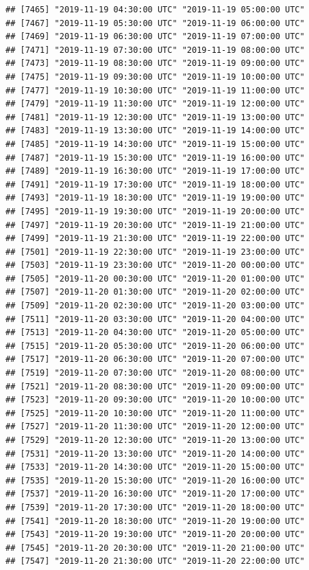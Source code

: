 \documentclass{article}\usepackage[]{graphicx}\usepackage[]{color}
\makeatletter
\newenvironment{kframe}{%
 \def\at@end@of@kframe{}%
 \ifinner\ifhmode%
  \def\at@end@of@kframe{\end{minipage}}%
  \begin{minipage}{\columnwidth}%
 \fi\fi%
 \def\FrameCommand##1{\hskip\@totalleftmargin \hskip-\fboxsep
 \colorbox{shadecolor}{##1}\hskip-\fboxsep
     \hskip-\linewidth \hskip-\@totalleftmargin \hskip\columnwidth}%
 \MakeFramed {\advance\hsize-\width
   \@totalleftmargin\z@ \linewidth\hsize
   \@setminipage}}%
 {\par\unskip\endMakeFramed%
 \at@end@of@kframe}
\newenvironment{knitrout}{}{} %
\makeatother
\begin{document}
\begin{knitrout}
\begin{kframe}
\begin{verbatim}
## [7465] "2019-11-19 04:30:00 UTC" "2019-11-19 05:00:00 UTC"
## [7467] "2019-11-19 05:30:00 UTC" "2019-11-19 06:00:00 UTC"
## [7469] "2019-11-19 06:30:00 UTC" "2019-11-19 07:00:00 UTC"
## [7471] "2019-11-19 07:30:00 UTC" "2019-11-19 08:00:00 UTC"
## [7473] "2019-11-19 08:30:00 UTC" "2019-11-19 09:00:00 UTC"
## [7475] "2019-11-19 09:30:00 UTC" "2019-11-19 10:00:00 UTC"
## [7477] "2019-11-19 10:30:00 UTC" "2019-11-19 11:00:00 UTC"
## [7479] "2019-11-19 11:30:00 UTC" "2019-11-19 12:00:00 UTC"
## [7481] "2019-11-19 12:30:00 UTC" "2019-11-19 13:00:00 UTC"
## [7483] "2019-11-19 13:30:00 UTC" "2019-11-19 14:00:00 UTC"
## [7485] "2019-11-19 14:30:00 UTC" "2019-11-19 15:00:00 UTC"
## [7487] "2019-11-19 15:30:00 UTC" "2019-11-19 16:00:00 UTC"
## [7489] "2019-11-19 16:30:00 UTC" "2019-11-19 17:00:00 UTC"
## [7491] "2019-11-19 17:30:00 UTC" "2019-11-19 18:00:00 UTC"
## [7493] "2019-11-19 18:30:00 UTC" "2019-11-19 19:00:00 UTC"
## [7495] "2019-11-19 19:30:00 UTC" "2019-11-19 20:00:00 UTC"
## [7497] "2019-11-19 20:30:00 UTC" "2019-11-19 21:00:00 UTC"
## [7499] "2019-11-19 21:30:00 UTC" "2019-11-19 22:00:00 UTC"
## [7501] "2019-11-19 22:30:00 UTC" "2019-11-19 23:00:00 UTC"
## [7503] "2019-11-19 23:30:00 UTC" "2019-11-20 00:00:00 UTC"
## [7505] "2019-11-20 00:30:00 UTC" "2019-11-20 01:00:00 UTC"
## [7507] "2019-11-20 01:30:00 UTC" "2019-11-20 02:00:00 UTC"
## [7509] "2019-11-20 02:30:00 UTC" "2019-11-20 03:00:00 UTC"
## [7511] "2019-11-20 03:30:00 UTC" "2019-11-20 04:00:00 UTC"
## [7513] "2019-11-20 04:30:00 UTC" "2019-11-20 05:00:00 UTC"
## [7515] "2019-11-20 05:30:00 UTC" "2019-11-20 06:00:00 UTC"
## [7517] "2019-11-20 06:30:00 UTC" "2019-11-20 07:00:00 UTC"
## [7519] "2019-11-20 07:30:00 UTC" "2019-11-20 08:00:00 UTC"
## [7521] "2019-11-20 08:30:00 UTC" "2019-11-20 09:00:00 UTC"
## [7523] "2019-11-20 09:30:00 UTC" "2019-11-20 10:00:00 UTC"
## [7525] "2019-11-20 10:30:00 UTC" "2019-11-20 11:00:00 UTC"
## [7527] "2019-11-20 11:30:00 UTC" "2019-11-20 12:00:00 UTC"
## [7529] "2019-11-20 12:30:00 UTC" "2019-11-20 13:00:00 UTC"
## [7531] "2019-11-20 13:30:00 UTC" "2019-11-20 14:00:00 UTC"
## [7533] "2019-11-20 14:30:00 UTC" "2019-11-20 15:00:00 UTC"
## [7535] "2019-11-20 15:30:00 UTC" "2019-11-20 16:00:00 UTC"
## [7537] "2019-11-20 16:30:00 UTC" "2019-11-20 17:00:00 UTC"
## [7539] "2019-11-20 17:30:00 UTC" "2019-11-20 18:00:00 UTC"
## [7541] "2019-11-20 18:30:00 UTC" "2019-11-20 19:00:00 UTC"
## [7543] "2019-11-20 19:30:00 UTC" "2019-11-20 20:00:00 UTC"
## [7545] "2019-11-20 20:30:00 UTC" "2019-11-20 21:00:00 UTC"
## [7547] "2019-11-20 21:30:00 UTC" "2019-11-20 22:00:00 UTC"

\end{verbatim}
\end{kframe}
\end{knitrout}
\end{document}
